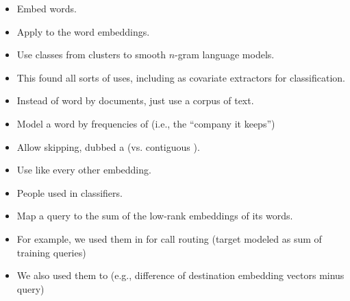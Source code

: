 \documentclass[10pt]{report}
\begin{document}
\begin{itemize}
\item Embed words.
\item Apply  to the word embeddings.
\item Use classes from clusters to smooth $n$-gram language models.
\item This found all sorts of uses, including as covariate extractors
  for classification.
\end{itemize}
\vfill
{}


\begin{itemize}
\item Instead of word by documents, just use a corpus of text.
\item Model a word by frequencies of 
  (i.e., the ``company it keeps'')
\item Allow skipping, dubbed a  (vs. contiguous
  ).
\item Use like every other embedding.
  \vfill
  \\
\end{itemize}

\begin{itemize}
\item People used  in
  classifiers.
\item Map a query to the sum of the low-rank embeddings of its words.
\item For example, we used them in  for call routing
  (target modeled as sum of training queries)
\item We also used them to 
  (e.g., difference of destination embedding vectors minus query)
  \\
\vfill
{}
\end{itemize}
\end{document}
